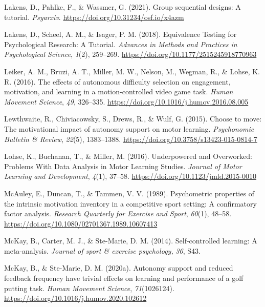 \documentclass[
  english,
  doc, donotrepeattitle,floatsintext]{apa7}
\newlength{\cslhangindent}
\newlength{\cslentryspacingunit} %
\newenvironment{CSLReferences}[2] %
 {%
  \setlength{\parindent}{0pt}
  \ifodd #1
  \let\oldpar\par
  \def\par{\hangindent=\cslhangindent\oldpar}
  \fi
  \setlength{\parskip}{#2\cslentryspacingunit}
 }%
 {}
\begin{document}
\begin{CSLReferences}{1}{0}
\leavevmode{}%
Lakens, D., Pahlke, F., \& Wassmer, G. (2021). Group sequential designs: A tutorial. \emph{Psyarxiv}. \url{https://doi.org/10.31234/osf.io/x4azm}

\leavevmode{}%
Lakens, D., Scheel, A. M., \& Isager, P. M. (2018). Equivalence Testing for Psychological Research: A Tutorial. \emph{Advances in Methods and Practices in Psychological Science}, \emph{1}(2), 259--269. \url{https://doi.org/10.1177/2515245918770963}

\leavevmode{}%
Leiker, A. M., Bruzi, A. T., Miller, M. W., Nelson, M., Wegman, R., \& Lohse, K. R. (2016). The effects of autonomous difficulty selection on engagement, motivation, and learning in a motion-controlled video game task. \emph{Human Movement Science}, \emph{49}, 326--335. \url{https://doi.org/10.1016/j.humov.2016.08.005}

\leavevmode{}%
Lewthwaite, R., Chiviacowsky, S., Drews, R., \& Wulf, G. (2015). Choose to move: The motivational impact of autonomy support on motor learning. \emph{Psychonomic Bulletin \& Review}, \emph{22}(5), 1383--1388. \url{https://doi.org/10.3758/s13423-015-0814-7}

\leavevmode{}%
Lohse, K., Buchanan, T., \& Miller, M. (2016). Underpowered and Overworked: Problems With Data Analysis in Motor Learning Studies. \emph{Journal of Motor Learning and Development}, \emph{4}(1), 37--58. \url{https://doi.org/10.1123/jmld.2015-0010}

\leavevmode{}%
McAuley, E., Duncan, T., \& Tammen, V. V. (1989). Psychometric properties of the intrinsic motivation inventory in a competitive sport setting: A confirmatory factor analysis. \emph{Research Quarterly for Exercise and Sport}, \emph{60}(1), 48--58. \url{https://doi.org/10.1080/02701367.1989.10607413}

\leavevmode{}%
McKay, B., Carter, M. J., \& Ste-Marie, D. M. (2014). Self-controlled learning: A meta-analysis. \emph{Journal of sport \& exercise psychology,} \emph{36}, S43.

\leavevmode{}%
McKay, B., \& Ste-Marie, D. M. (2020a). Autonomy support and reduced feedback frequency have trivial effects on learning and performance of a golf putting task. \emph{Human Movement Science}, \emph{71}(1026124). \url{https://doi.org/10.1016/j.humov.2020.102612}


\end{CSLReferences}
\end{document}
